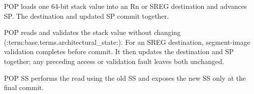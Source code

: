 POP loads one 64-bit stack value into an Rn or SREG destination and advances SP. The destination and updated SP commit together.

POP reads and validates the stack value without changing (:term:base.terms.architectural_state:). For an SREG destination, segment-image
validation completes before commit. It then updates the destination and SP together; any preceding access or
validation fault leaves both unchanged.

POP SS performs the read using the old SS and exposes the new SS only at the final commit.
